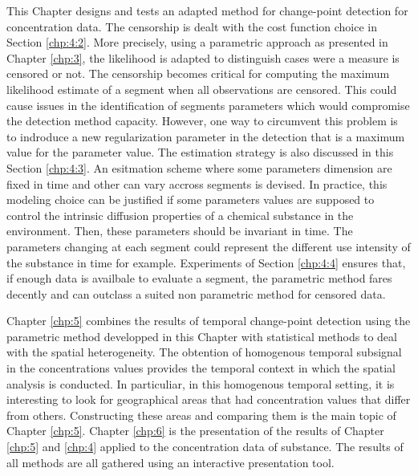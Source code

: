 This Chapter designs and tests an adapted method for change-point detection for concentration data. The censorship is dealt with the cost function choice in Section \ref{chp:4:2}. More precisely, using a parametric approach as presented in Chapter \ref{chp:3}, the likelihood is adapted to distinguish cases were a measure is censored or not. The censorship becomes critical for computing the maximum likelihood estimate of a segment when all observations are censored. This could cause issues in the identification of segments parameters which would compromise the detection method capacity. However, one way to circumvent this problem is to indroduce a new regularization parameter in the detection that is a maximum value for the parameter value. The estimation strategy is also discussed in this Section \ref{chp:4:3}. An esitmation scheme where some parameters dimension are fixed in time and other can vary accross segments is devised. In practice, this modeling choice can be justified if some parameters values are supposed to control the intrinsic diffusion properties of a chemical substance in the environment. Then, these parameters should be invariant in time. The parameters changing at each segment could represent the different use intensity of the substance in time for example. Experiments of Section \ref{chp:4:4} ensures that, if enough data is availbale to evaluate a segment, the parametric method fares decently and can outclass a suited non parametric method for censored data. 

Chapter \ref{chp:5} combines the results of temporal change-point detection using the parametric method developped in this Chapter with statistical methods to deal with the spatial heterogeneity. The obtention of homogenous temporal subsignal in the concentrations values provides the temporal context in which the spatial analysis is conducted. In particuliar, in this homogenous temporal setting, it is interesting to look for geographical areas that had concentration values that differ from others. Constructing these areas and comparing them is the main topic of Chapter \ref{chp:5}. Chapter \ref{chp:6} is the presentation of the results of Chapter \ref{chp:5} and \ref{chp:4} applied to the concentration data of substance. The results of all methods are all gathered using an interactive presentation tool.     

       

 